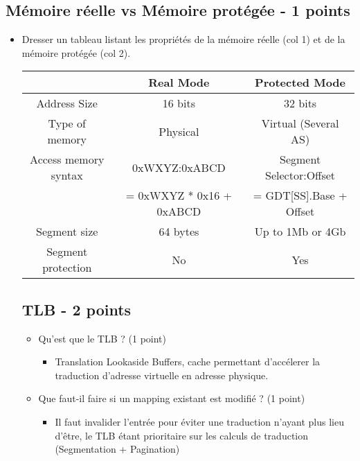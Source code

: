 \begin{correction}
\subsection{Mémoire réelle vs Mémoire protégée - 1 points}
\begin{itemize}
   \item Dresser un tableau listant les propriétés de la mémoire réelle (col 1) et de la mémoire protégée (col 2).
    \begin{itemize}
      \begin{tabular}{|c|c|c|}
          \hline
   	  & Real Mode & Protected Mode\\
	  \hline
	  Address Size & 16 bits & 32 bits\\
	  \hline
          Type of memory & Physical & Virtual (Several AS)\\
	  \hline
	  Access memory syntax & 0xWXYZ:0xABCD & Segment Selector:Offset\\
	  & = 0xWXYZ * 0x16 + 0xABCD & = GDT[SS].Base + Offset\\
	  \hline
	  Segment size & 64 bytes & Up to 1Mb or 4Gb \\
	  \hline
	  Segment protection & No & Yes\\
 	  \hline
       \end{tabular}
    \end{itemize}

\subsection{TLB - 2 points}
\begin{itemize}
   \item Qu'est que le TLB ? (1 point)
   \begin{itemize}
       \item Translation Lookaside Buffers, cache permettant d'accélerer la traduction d'adresse virtuelle en adresse physique.
   \end{itemize}

   \item Que faut-il faire si un mapping existant est modifié ? (1 point)
   \begin{itemize}
        \item Il faut invalider l'entrée pour éviter une traduction n'ayant plus lieu d'être, le TLB étant prioritaire sur les calculs de traduction (Segmentation + Pagination)
   \end{itemize}
\end{itemize}


\end{itemize}
\end{correction}
